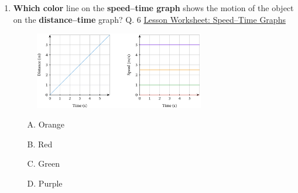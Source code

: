 \documentclass[A4,12pt]{article}
\begin{document}
\begin{enumerate}[label=\bfseries (\arabic*)]
\item \textbf{Which color} line on the \textbf{speed–time graph} shows the motion of the object on the \textbf{distance–time} graph? \cite{Nagwa} Q. 6 \href{https://www.nagwa.com/en/worksheets/257191315239/}{Lesson Worksheet: Speed–Time Graphs}
%
\begin{figure}[H]
    \centering
    \includegraphics[width=0.7\textwidth]{Nagwa_Q6_Speedt.png}
\end{figure}
%
\begin{itemize}
    \item[A.] Orange
    \item[B.] Red
    \item[C.] Green
    \item[D.] Purple
\end{itemize}
%













\end{enumerate}
\end{document}
